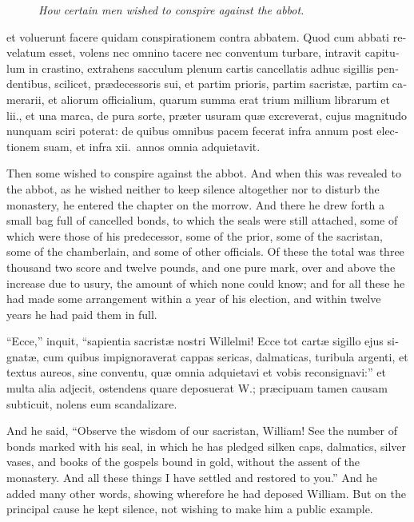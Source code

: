 \documentclass[10pt]{book}
\newcommand{\blockhead}[4][]{
\begin{figure}
\centering
\vspace{#4}
\parbox{2.75cm}{\begin{center}\footnotesize \color{BrickRed} \emph{#2}\\ #1 \end{center}}
\end{figure}
}
\begin{document}
\begin{paracol}{2}
\begin{otherlanguage}{latin}
\blockhead{How certain men wished to conspire against the abbot.}{3}{-0.55cm}
et voluerunt facere quidam conspirationem contra abbatem. Quod cum abbati revelatum esset, volens nec omnino tacere nec conventum turbare, intravit capitulum in crastino, extrahens sacculum plenum cartis cancellatis adhuc sigillis pendentibus, scilicet, pr\ae{}decessoris sui, et partim prioris, partim sacrist\ae{}, partim camerarii, et aliorum officialium, quarum summa erat trium millium librarum et lii., et una marca, de pura sorte, pr\ae{}ter usuram qu\ae{} excreverat, cujus magnitudo nunquam sciri poterat: de quibus omnibus pacem fecerat infra annum post electionem suam, et infra xii.\ annos omnia adquietavit.

\end{otherlanguage}

\switchcolumn

Then some wished to conspire against the abbot. And when this was revealed to the abbot, as he wished neither to keep silence altogether nor to disturb the monastery, he entered the chapter on the morrow. And there he drew forth a small bag full of cancelled bonds, to which the seals were still attached, some of which were those of his predecessor, some of the prior, some of the sacristan, some of the chamberlain, and some of other officials. Of these the total was three thousand two score and twelve pounds, and one pure mark, over and above the increase due to usury, the amount of which none could know; and for all these he had made some arrangement within a year of his election, and within twelve years he had paid them in full.

\switchcolumn*

\begin{otherlanguage}{latin}
``Ecce,'' inquit, ``sapientia sacrist\ae{} nostri Willelmi! Ecce tot cart\ae{} sigillo ejus signat\ae{}, cum quibus impignoraverat cappas sericas, dalmaticas, turibula argenti, et textus aureos, sine conventu, qu\ae{} omnia adquietavi et vobis reconsignavi:'' et multa alia adjecit, ostendens quare deposuerat W.; pr\ae{}cipuam tamen causam subticuit, nolens eum scandalizare.
\end{otherlanguage}

\switchcolumn

And he said, ``Observe the wisdom of our sacristan, William! See the number of bonds marked with his seal, in which he has pledged silken caps, dalmatics, silver vases, and books of the gospels bound in gold, without the assent of the monastery. And all these things I have settled and restored to you.'' And he added many other words, showing wherefore he had deposed William. But on the principal cause he kept silence, not wishing to make him a public example.


\end{paracol}
\end{document}
